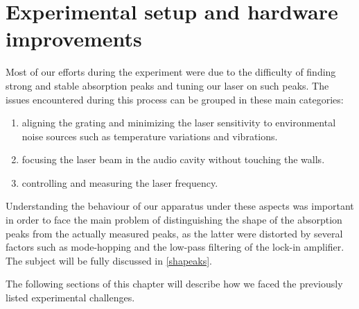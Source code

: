 \chapter{Experimental setup and hardware improvements}\label{chapter2}
Most of our efforts during the experiment were due to the difficulty of finding strong and stable absorption peaks and tuning our laser on such peaks.
The issues encountered during this process can be grouped in these main categories:
\begin{enumerate} 
\item aligning the grating and minimizing the laser sensitivity to environmental noise sources such as temperature variations and vibrations.
\item focusing the laser beam in the audio cavity without touching the walls.
\item controlling and measuring the laser frequency.
\end{enumerate}
Understanding the behaviour of our apparatus under these aspects was important in order to face the main problem of distinguishing the shape of the absorption peaks from the actually measured peaks, as the latter were distorted by several factors such as mode-hopping and the low-pass filtering of the lock-in amplifier. The subject will be fully discussed in \cref{shapeaks}.

\medskip
The following sections of this chapter will describe how we faced the previously listed experimental challenges.

